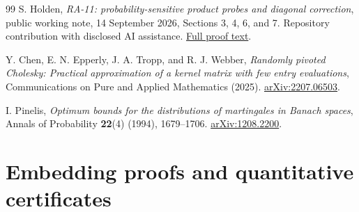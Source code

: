 \documentclass[11pt,a4paper]{article}
\theoremstyle{definition}\newtheorem{definition}[theorem]{Definition}
\theoremstyle{remark}\newtheorem{remark}[theorem]{Remark}
\numberwithin{equation}{section}
\begin{document}
\begin{thebibliography}{99}
S. Holden,
\emph{RA-11: probability-sensitive product probes and diagonal correction},
public working note, 14 September 2026, Sections 3, 4, 6, and 7.
Repository contribution with disclosed AI assistance.
\href{https://github.com/ajt60gaibb/OpenProblemsInNLA/blob/main/references/holden-further-2026-09-14/RA-11/manuscript.md}{Full proof text}.

Y. Chen, E. N. Epperly, J. A. Tropp, and R. J. Webber,
\emph{Randomly pivoted Cholesky: Practical approximation of a kernel
matrix with few entry evaluations},
Communications on Pure and Applied Mathematics (2025).
\href{https://arxiv.org/abs/2207.06503}{arXiv:2207.06503}.

I. Pinelis,
\emph{Optimum bounds for the distributions of martingales in Banach spaces},
Annals of Probability \textbf{22}(4) (1994), 1679--1706.
\href{https://arxiv.org/abs/1208.2200}{arXiv:1208.2200}.

\end{thebibliography}

\clearpage\appendix
\section{Embedding proofs and quantitative certificates}
\label{appendix:covariance}
\end{document}
